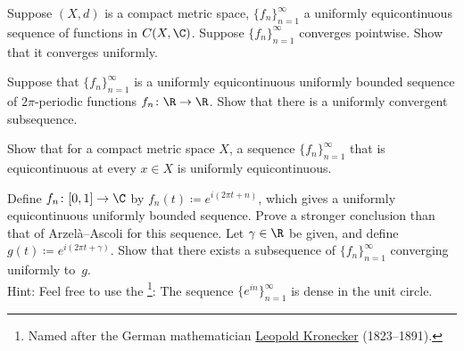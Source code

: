 \begin{exercise}
Suppose $(X,d)$ is a compact metric space, $\{ f_n \}_{n=1}^\infty$ a uniformly equicontinuous
sequence of functions in $C(X,\C)$.  Suppose $\{ f_n \}_{n=1}^\infty$ converges
pointwise.  Show that it converges uniformly.
\end{exercise}

\begin{exercise}
Suppose that $\{ f_n \}_{n=1}^\infty$ is a uniformly equicontinuous uniformly bounded sequence of
$2\pi$-periodic functions $f_n \colon \R \to \R$.  Show that there is a
uniformly convergent subsequence.
\end{exercise}

\begin{exercise}
Show that for a compact metric space $X$,
a sequence $\{ f_n \}_{n=1}^\infty$ that is equicontinuous at every $x \in X$
is uniformly equicontinuous.
\end{exercise}

\begin{exercise}
Define $f_n \colon [0,1] \to \C$ by $f_n(t) \coloneqq e^{i(2\pi t + n)}$,
which gives a uniformly equicontinuous uniformly bounded sequence.
Prove a stronger conclusion than that of Arzel\`a--Ascoli for this sequence.
Let $\gamma \in \R$ be given,
and define $g(t) \coloneqq e^{i(2\pi t + \gamma)}$.  Show that there exists 
a subsequence of $\{ f_n \}_{n=1}^\infty$ converging uniformly to~$g$.
\\
Hint: Feel free to use the \emph{}\footnote{%
Named after the German mathematician
\href{https://en.wikipedia.org/wiki/Leopold_Kronecker}{Leopold Kronecker}
(1823--1891).}:
The sequence $\{ e^{in} \}_{n=1}^\infty$ is dense in the unit circle.
\end{exercise}

